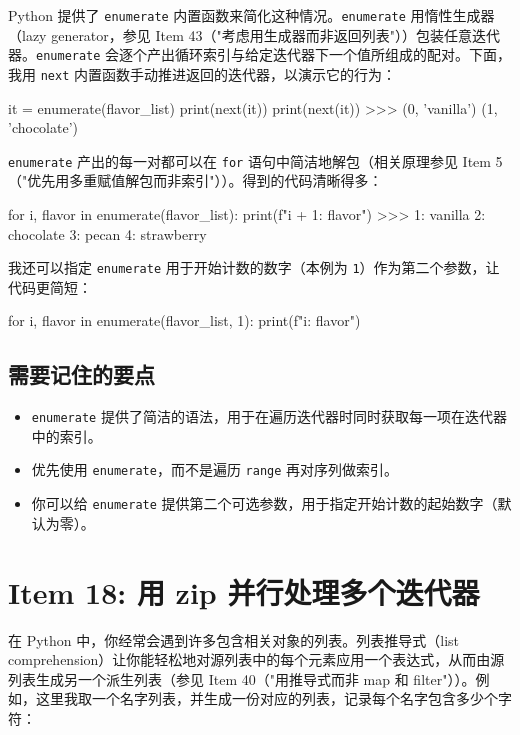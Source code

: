 Python 提供了 \texttt{enumerate} 内置函数来简化这种情况。\texttt{enumerate} 用惰性生成器（lazy generator，参见 Item 43（"考虑用生成器而非返回列表"））包装任意迭代器。\texttt{enumerate} 会逐个产出循环索引与给定迭代器下一个值所组成的配对。下面，我用 \texttt{next} 内置函数手动推进返回的迭代器，以演示它的行为：

\begin{codebox}[python]
it = enumerate(flavor_list)
print(next(it))
print(next(it))
>>>
(0, 'vanilla')
(1, 'chocolate')
\end{codebox}

\texttt{enumerate} 产出的每一对都可以在 \texttt{for} 语句中简洁地解包（相关原理参见 Item 5（"优先用多重赋值解包而非索引"））。得到的代码清晰得多：

\begin{codebox}[python]
for i, flavor in enumerate(flavor_list):
    print(f"{i + 1}: {flavor}")
>>>
1: vanilla
2: chocolate
3: pecan
4: strawberry
\end{codebox}

我还可以指定 \texttt{enumerate} 用于开始计数的数字（本例为 \texttt{1}）作为第二个参数，让代码更简短：

\begin{codebox}[python]
for i, flavor in enumerate(flavor_list, 1):
    print(f"{i}: {flavor}")
\end{codebox}

\subsection{需要记住的要点}
\begin{itemize}
\item \texttt{enumerate} 提供了简洁的语法，用于在遍历迭代器时同时获取每一项在迭代器中的索引。
\item 优先使用 \texttt{enumerate}，而不是遍历 \texttt{range} 再对序列做索引。
\item 你可以给 \texttt{enumerate} 提供第二个可选参数，用于指定开始计数的起始数字（默认为零）。
\end{itemize}

\section{Item 18: 用 zip 并行处理多个迭代器}

在 Python 中，你经常会遇到许多包含相关对象的列表。列表推导式（list comprehension）让你能轻松地对源列表中的每个元素应用一个表达式，从而由源列表生成另一个派生列表（参见 Item 40（"用推导式而非 map 和 filter"））。例如，这里我取一个名字列表，并生成一份对应的列表，记录每个名字包含多少个字符：

